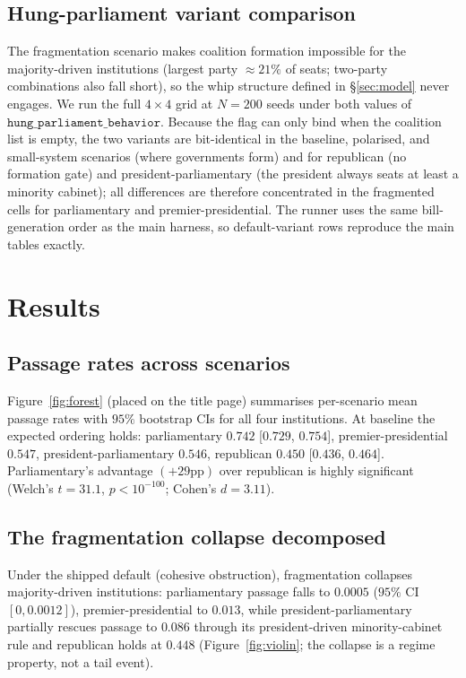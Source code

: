 \documentclass[11pt]{article}
\begin{document}
\subsection{Hung-parliament variant comparison}
\label{sec:design:hung}
The fragmentation scenario makes coalition formation impossible for the
majority-driven institutions (largest party $\approx 21\%$ of seats; two-party
combinations also fall short), so the whip structure defined in
\S\ref{sec:model} never engages. We run the full $4 \times 4$ grid at
$N=200$ seeds under both values of
$\texttt{hung\_parliament\_behavior}$. Because the flag can only bind when
the coalition list is empty, the two variants are bit-identical in the
baseline, polarised, and small-system scenarios (where governments form) and
for republican (no formation gate) and president-parliamentary (the president
always seats at least a minority cabinet); all differences are therefore
concentrated in the fragmented cells for parliamentary and
premier-presidential. The runner uses the same bill-generation order as the
main harness, so default-variant rows reproduce the main tables exactly.

\section{Results}
\label{sec:results}

\subsection{Passage rates across scenarios}
\label{sec:results:passage}

Figure~\ref{fig:forest} (placed on the title page) summarises per-scenario
mean passage rates with $95\%$ bootstrap CIs for all four institutions. At
baseline the expected ordering holds: parliamentary $0.742$
[$0.729$, $0.754$], premier-presidential $0.547$, president-parliamentary
$0.546$, republican $0.450$ [$0.436$, $0.464$]. Parliamentary's advantage
$(+29\text{pp})$ over republican is highly significant (Welch's $t = 31.1$,
$p < 10^{-100}$; Cohen's $d = 3.11$).

\subsection{The fragmentation collapse decomposed}
\label{sec:results:collapse}

Under the shipped default (cohesive obstruction), fragmentation collapses
majority-driven institutions: parliamentary passage falls to $0.0005$
($95\%$ CI $[0, 0.0012]$), premier-presidential to $0.013$, while
president-parliamentary partially rescues passage to $0.086$ through its
president-driven minority-cabinet rule and republican holds at $0.448$
(Figure~\ref{fig:violin}; the collapse is a regime property, not a tail
event).
\end{document}
